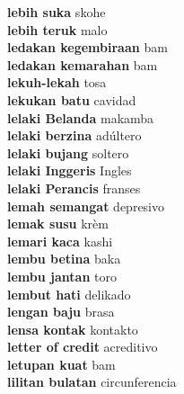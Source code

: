 \textbf{ lebih suka  } skohe \\
\textbf{ lebih teruk  } malo \\
\textbf{ ledakan kegembiraan  } bam \\
\textbf{ ledakan kemarahan  } bam \\
\textbf{ lekuh-lekah  } tosa \\
\textbf{ lekukan batu  } cavidad \\
\textbf{ lelaki Belanda  } makamba \\
\textbf{ lelaki berzina  } adúltero \\
\textbf{ lelaki bujang  } soltero \\
\textbf{ lelaki Inggeris  } Ingles \\
\textbf{ lelaki Perancis  } franses \\
\textbf{ lemah semangat  } depresivo \\
\textbf{ lemak susu  } krèm \\
\textbf{ lemari kaca  } kashi \\
\textbf{ lembu betina  } baka \\
\textbf{ lembu jantan  } toro \\
\textbf{ lembut hati  } delikado \\
\textbf{ lengan baju  } brasa \\
\textbf{ lensa kontak  } kontakto \\
\textbf{ letter of credit  } acreditivo \\
\textbf{ letupan kuat  } bam \\
\textbf{ lilitan bulatan  } circunferencia \\
